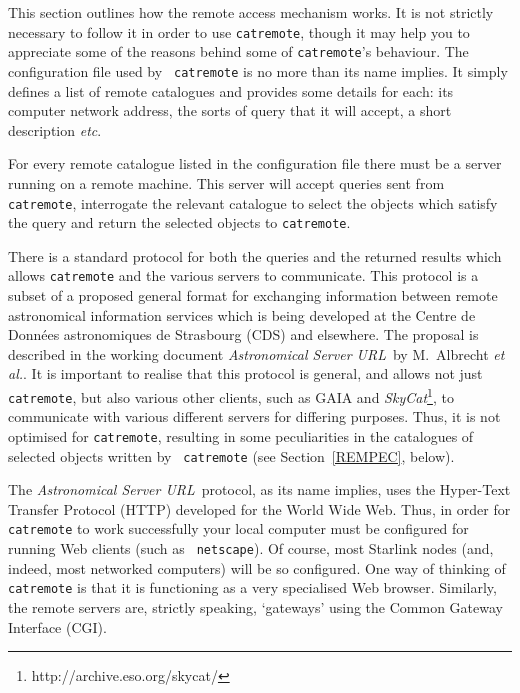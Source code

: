 \documentclass[twoside,11pt]{article}
\newcommand{\htmladdnormallinkfoot}[2]{#1\footnote{#2}}
\newcommand{\xref}[3]{#1}
\renewcommand{\_}{\texttt{\symbol{95}}}
\begin{document}
This section outlines how the remote access mechanism works.  It is
not strictly necessary to follow it in order to use {\tt catremote},
though it may help you to appreciate some of the reasons behind some
of {\tt catremote}'s behaviour.  The configuration file used by {\tt
catremote} is no more than its name implies.  It simply defines a list of
remote catalogues and provides some details for each: its computer network
address, the sorts of query that it will accept, a short description
\emph{etc}.

For every remote catalogue listed in the configuration file there must
be a server running on a remote machine.  This server will accept
queries sent from {\tt catremote}, interrogate the relevant catalogue
to select the objects which satisfy the query and return the selected
objects to {\tt catremote}.

There is a standard protocol for both the queries and the returned
results which allows {\tt catremote} and the various servers to
communicate.  This protocol is a subset of a proposed general format
for exchanging information between remote astronomical information services
which is being developed at the Centre de Donn\'{e}es astronomiques de
Strasbourg (CDS) and elsewhere.  The proposal is described in the
working document {\it Astronomical Server URL}\, by M.~Albrecht {\it et
al.}\cite{SERVERURL}.  It is important to realise that this protocol
is general, and allows not just {\tt catremote}, but also various other
clients, such as \xref{GAIA}{sun214}{}\cite{SUN214} and
\htmladdnormallinkfoot{{\it SkyCat}\/}{http://archive.eso.org/skycat/},
to communicate with various different servers for differing purposes.
Thus, it is not optimised for {\tt catremote}, resulting in some
peculiarities in the catalogues of selected objects written by {\tt
catremote} (see Section~\ref{REMPEC}, below).

The {\it Astronomical Server URL}\, protocol, as its name implies, uses
the Hyper-Text Transfer Protocol (HTTP) developed for the World Wide
Web.  Thus, in order for {\tt catremote} to work successfully your
local computer must be configured for running Web clients (such as {\tt
netscape}).  Of course, most Starlink nodes (and, indeed, most networked
computers) will be so configured.  One way of thinking of {\tt
catremote} is that it is functioning as a very specialised Web browser.
Similarly, the remote servers are, strictly speaking, `gateways'
using the Common Gateway Interface (CGI).
\end{document}
